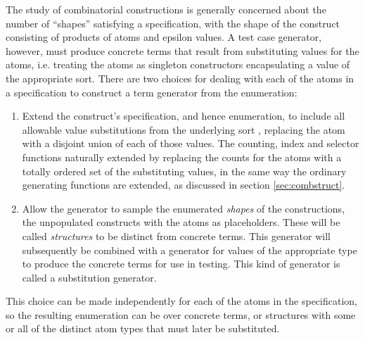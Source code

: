 
The study of combinatorial constructions is generally concerned
about the number of ``shapes'' satisfying a specification,
with the shape of the construct consisting of products of atoms and epsilon values.
A test case generator, however,
must produce concrete terms that result from substituting values for the atoms,
i.e. treating the atoms as singleton constructors encapsulating a value of the appropriate sort.
There are two choices for dealing with each of the atoms in a specification 
to construct a term generator from the enumeration:

\begin{enumerate}
\item Extend the construct's specification, and hence enumeration, 
to include all allowable value substitutions from the underlying sort ,
replacing the atom with a disjoint union of each of those values.
The counting, index and selector functions naturally extended
by replacing the counts for the atoms with a totally ordered set of the substituting values,
in the same way the ordinary generating functions are extended,
as discussed in section \ref{sec:combstruct}.
\item Allow the generator to sample the enumerated \emph{shapes} of the constructions,
the unpopulated constructs with the atoms as placeholders.
These will be called \emph{structures} to be distinct from concrete terms.
This generator will subsequently be combined with a generator for values of the appropriate type
to produce the concrete terms for use in testing.
This kind of generator is called a substitution generator.
\end{enumerate}

\noindent
This choice can be made independently for each of the atoms in the specification,
so the resulting enumeration can be over concrete terms,
or structures with some or all of the distinct atom types 
that must later be substituted.

